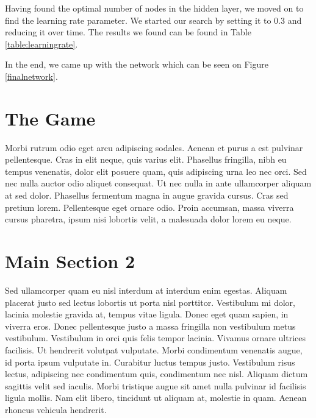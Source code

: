 Having found the optimal number of nodes in the hidden layer, we moved on to find the learning rate parameter. We started our search by setting it to 0.3 and reducing it over time. The results we found can be found in Table \ref{table:learningrate}.


In the end, we came up with the network which can be seen on Figure \ref{finalnetwork}.


\section{The Game}
Morbi rutrum odio eget arcu adipiscing sodales. Aenean et purus a est pulvinar pellentesque. Cras in elit neque, quis varius elit. Phasellus fringilla, nibh eu tempus venenatis, dolor elit posuere quam, quis adipiscing urna leo nec orci. Sed nec nulla auctor odio aliquet consequat. Ut nec nulla in ante ullamcorper aliquam at sed dolor. Phasellus fermentum magna in augue gravida cursus. Cras sed pretium lorem. Pellentesque eget ornare odio. Proin accumsan, massa viverra cursus pharetra, ipsum nisi lobortis velit, a malesuada dolor lorem eu neque.



\section{Main Section 2}

Sed ullamcorper quam eu nisl interdum at interdum enim egestas. Aliquam placerat justo sed lectus lobortis ut porta nisl porttitor. Vestibulum mi dolor, lacinia molestie gravida at, tempus vitae ligula. Donec eget quam sapien, in viverra eros. Donec pellentesque justo a massa fringilla non vestibulum metus vestibulum. Vestibulum in orci quis felis tempor lacinia. Vivamus ornare ultrices facilisis. Ut hendrerit volutpat vulputate. Morbi condimentum venenatis augue, id porta ipsum vulputate in. Curabitur luctus tempus justo. Vestibulum risus lectus, adipiscing nec condimentum quis, condimentum nec nisl. Aliquam dictum sagittis velit sed iaculis. Morbi tristique augue sit amet nulla pulvinar id facilisis ligula mollis. Nam elit libero, tincidunt ut aliquam at, molestie in quam. Aenean rhoncus vehicula hendrerit.